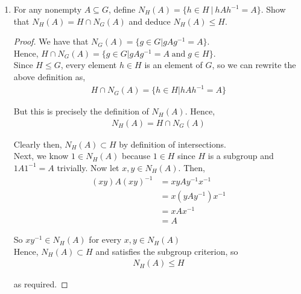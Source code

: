 \documentclass[11pt, reqno]{amsart}
\theoremstyle{plain}
\theoremstyle{definition}
\theoremstyle{example}
\begin{document}
\begin{enumerate}[1.]
\begin{enumerate}
\item For any nonempty $A \subseteq G$, define $N_H(A) = \{ h \in H ~|~ hAh^{-1} = A \}$. Show that $N_H(A) = H \cap N_G(A)$ and deduce $N_H(A) \leq H$. 
\begin{proof}
We have that $N_G(A) = \{g \in G | gAg^{-1} = A\}$.\\

Hence, $H \cap N_G(A) = \{g \in G | gAg^{-1} = A \; \text{and} \; g \in H\}$.\\

Since $H \leqslant G$, every element $h \in H$ is an element of $G$, so we can rewrite the above definition as,
\begin{align*}
H \cap N_G(A) = \{h \in H | hAh^{-1} = A\}
\end{align*}

But this is precisely the definition of $N_H(A)$. Hence,
\begin{align*}
N_H(A) = H \cap N_G(A)
\end{align*}

Clearly then, $N_H(A) \subset H$ by definition of intersections.\\

Next, we know $1 \in N_H(A)$ because $1 \in H$ since $H$ is a subgroup and $1A1^{-1} = A$ trivially. Now let $x, y \in N_H(A)$. Then,
\begin{align*}
(xy)A(xy)^{-1} &= xyAy^{-1}x^{-1}\\
&= x(yAy^{-1})x^{-1}\\
&= xAx^{-1}\\
&= A
\end{align*}

So $xy^{-1} \in N_H(A)$ for every $x, y \in N_H(A)$\\

Hence, $N_H(A) \subset H$ and satisfies the subgroup criterion, so
\begin{align*}
N_H(A) \leqslant H
\end{align*}

as required.
\end{proof}
\end{enumerate}

\end{enumerate}
\end{document}
